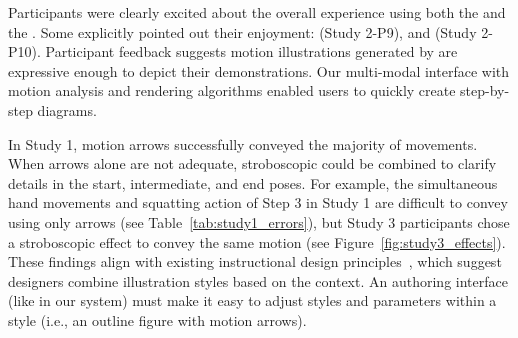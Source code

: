 Participants were clearly excited about the overall experience using both the \phaseI{} and the \phaseII{}.
%
Some explicitly pointed out their enjoyment:
 (Study 2-P9), and
 (Study 2-P10).
%
Participant feedback suggests motion illustrations generated by \systemname{} are expressive enough to depict their demonstrations. Our multi-modal interface with motion analysis and rendering algorithms enabled users to quickly create step-by-step diagrams.




In Study 1, motion arrows successfully conveyed the majority of movements. When arrows alone are not adequate, stroboscopic could be combined to clarify details in the start, intermediate, and end poses. For example, the simultaneous hand movements and squatting action of Step 3 in Study 1 are difficult to convey using only arrows (see Table~\ref{tab:study1_errors}), but Study 3 participants chose a stroboscopic effect to convey the same motion (see Figure~\ref{fig:study3_effects}).
%
These findings align with existing instructional design principles~\cite{mijksenaar1999open}, which suggest designers combine illustration styles based on the context. An authoring interface (like \phaseII{} in our system) must make it easy to adjust styles and parameters within a style (i.e., an outline figure with motion arrows).

